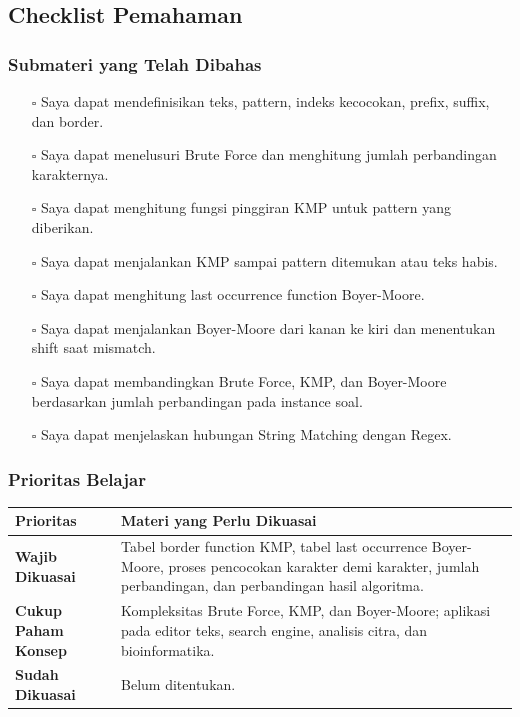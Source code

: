 \subsection{Checklist Pemahaman}

\subsubsection{Submateri yang Telah Dibahas}
\begin{itemize}
    \item[$\square$] Saya dapat mendefinisikan teks, pattern, indeks kecocokan, prefix, suffix, dan border.
    \item[$\square$] Saya dapat menelusuri Brute Force dan menghitung jumlah perbandingan karakternya.
    \item[$\square$] Saya dapat menghitung fungsi pinggiran KMP untuk pattern yang diberikan.
    \item[$\square$] Saya dapat menjalankan KMP sampai pattern ditemukan atau teks habis.
    \item[$\square$] Saya dapat menghitung last occurrence function Boyer-Moore.
    \item[$\square$] Saya dapat menjalankan Boyer-Moore dari kanan ke kiri dan menentukan shift saat mismatch.
    \item[$\square$] Saya dapat membandingkan Brute Force, KMP, dan Boyer-Moore berdasarkan jumlah perbandingan pada instance soal.
    \item[$\square$] Saya dapat menjelaskan hubungan String Matching dengan Regex.
\end{itemize}

\subsubsection{Prioritas Belajar}
\begin{tabularx}{\textwidth}{|L{0.22\textwidth}|X|}
\hline
\textbf{Prioritas} & \textbf{Materi yang Perlu Dikuasai} \\
\hline
\textbf{Wajib Dikuasai} & Tabel border function KMP, tabel last occurrence Boyer-Moore, proses pencocokan karakter demi karakter, jumlah perbandingan, dan perbandingan hasil algoritma. \\
\hline
\textbf{Cukup Paham Konsep} & Kompleksitas Brute Force, KMP, dan Boyer-Moore; aplikasi pada editor teks, search engine, analisis citra, dan bioinformatika. \\
\hline
\textbf{Sudah Dikuasai} & Belum ditentukan. \\
\hline
\end{tabularx}
